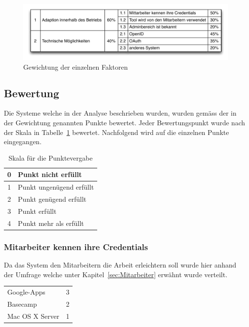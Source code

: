 \begin{figure}[ht]
    \centering 
		\includegraphics[width=1\textwidth]{include/nutzwertanalyse1.pdf}
		\caption{Gewichtung der einzelnen Faktoren}
		\label{fig:nutzwertanalyse gewichtung}
\end{figure}

\subsection{Bewertung}
\label{sub:Bewertung}
Die Systeme welche in der Analyse beschrieben wurden, wurden gemäss der in der
Gewichtung genannten Punkte bewertet. Jeder Bewertungspunkt wurde nach der Skala
in Tabelle~\ref{tab:nutzwertanalyse skala} bewertet. Nachfolgend wird auf die einzelnen Punkte eingegangen.

\begin{table}[h]
    \centering
        \begin{tabular}{|c|l|}
        \hline
        0 & Punkt nicht erfüllt\\
        \hline
        1 & Punkt ungenügend erfüllt\\
        \hline
        2 & Punkt genügend erfüllt\\
        \hline
        3 & Punkt erfüllt\\
        \hline
        4 & Punkt mehr als erfüllt\\
        \hline
        \end{tabular}
		\caption{Skala für die Punktevergabe}
		\label{tab:nutzwertanalyse skala}
\end{table}


\subsubsection{Mitarbeiter kennen ihre Credentials}
\label{ssub:Mitarbeiter kennen ihre Credentials}
Da das System den Mitarbeitern die Arbeit erleichtern soll wurde hier anhand
der Umfrage welche unter Kapitel~\ref{sec:Mitarbeiter} erwähnt wurde
verteilt.

\begin{tabular}{lc}
Google-Apps & 3\\
Basecamp & 2\\
Mac OS X Server & 1\\
\end{tabular}


